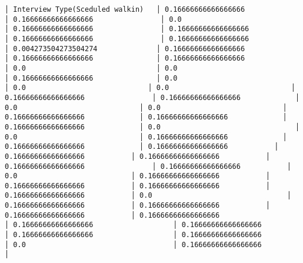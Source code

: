 \documentclass[11pt]{article}
\begin{document}
\begin{Verbatim}[commandchars=\\\{\}]
│ Interview Type(Sceduled walkin)   │ 0.16666666666666666                │ 0.16666666666666666                │ 0.0                                │ 0.16666666666666666                │ 0.16666666666666666                │ 0.16666666666666666                │ 0.16666666666666666                │ 0.004273504273504274              │ 0.16666666666666666               │ 0.16666666666666666               │ 0.16666666666666666                │ 0.0                               │ 0.0                               │ 0.16666666666666666               │ 0.0                             │ 0.0                             │ 0.0                             │ 0.16666666666666666                │ 0.16666666666666666             │ 0.0                             │ 0.0                             │ 0.16666666666666666             │ 0.16666666666666666             │ 0.16666666666666666             │ 0.0                                │ 0.0                             │ 0.16666666666666666             │ 0.16666666666666666             │ 0.16666666666666666           │ 0.16666666666666666           │ 0.16666666666666666           │ 0.16666666666666666                │ 0.16666666666666666           │ 0.0                           │ 0.16666666666666666           │ 0.16666666666666666           │ 0.16666666666666666           │ 0.16666666666666666           │ 0.0                                │ 0.16666666666666666           │ 0.16666666666666666           │ 0.16666666666666666           │ 0.16666666666666666                   │ 0.16666666666666666                   │ 0.16666666666666666                   │ 0.16666666666666666                   │ 0.16666666666666666                   │ 0.0                                   │ 0.16666666666666666                   │

\end{Verbatim}
\end{document}
